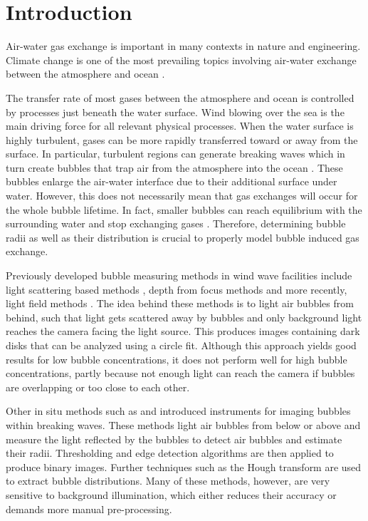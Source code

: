\chapter{Introduction}
	Air-water gas exchange is important in many contexts in nature and engineering. Climate change is one of the most prevailing topics involving air-water exchange between the atmosphere and ocean \citep{MischlerDiss}.
	
	The transfer rate of most gases between the atmosphere and ocean is controlled by processes just beneath the water surface. Wind blowing over the sea is the main driving force for all relevant physical processes. 
	When the water surface is highly turbulent, gases can be more rapidly transferred toward or away from the surface. In particular, turbulent regions can generate breaking waves which in turn create bubbles that trap air from the atmosphere into the ocean \citep{Terry}. These bubbles enlarge the air-water interface due to their additional surface under water. However, this does not necessarily mean that gas exchanges will occur for the whole bubble lifetime. In fact, smaller bubbles can reach equilibrium with the surrounding water and stop exchanging gases \citep{MischlerDiss}. Therefore, determining bubble radii as well as their distribution is crucial to properly model bubble induced gas exchange.
	
	Previously developed bubble measuring methods in wind wave facilities include light scattering based methods \citep{jaehne1984}, depth from focus methods \citep{geissler_1995} and more recently, light field methods \citep{MischlerDiss}. The idea behind these methods is to light air bubbles from behind, such that light gets scattered away by bubbles and only background light reaches the camera facing the light source. This produces images containing dark disks that can be analyzed using a circle fit. Although this approach yields good results for low bubble concentrations, it does not perform well for high bubble concentrations, partly because not enough light can reach the camera if bubbles are overlapping or too close to each other. 
	
	Other in situ methods such as \citet{Al-Lashi2016} and \citet{Leifer2003} introduced instruments for imaging bubbles within breaking waves. These methods light air bubbles from below or above and measure the light reflected by the bubbles to detect air bubbles and estimate their radii. Thresholding and edge detection algorithms are then applied to produce binary images. Further techniques such as the Hough transform \citep{Hough1972} are used to extract bubble distributions. Many of these methods, however, are very sensitive to background illumination, which either reduces their accuracy \citep{Zhong2016} or demands more manual pre-processing.
	
